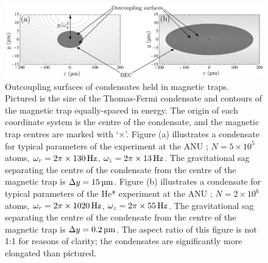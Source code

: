 \begin{figure}
    \centering
    \includegraphics[width=15cm]{OutcouplingSurfaces}
    \caption{Outcoupling surfaces of condensates held in magnetic traps.  Pictured is the size of the Thomas-Fermi condensate and contours of the magnetic trap equally-spaced in energy.  The origin of each coordinate system is the centre of the condensate, and the magnetic trap centres are marked with `$\times$'.  Figure (a) illustrates a condensate for typical parameters of the  experiment at the ANU \citep{Jeppesen:2008}; $N = 5 \times 10^5$ atoms, $\omega_r = 2 \pi \times \unit[130]{Hz}$, $\omega_z = 2 \pi \times \unit[13]{Hz}$.  The gravitational sag separating the centre of the condensate from the centre of the magnetic trap is $\Delta y = \unit[15]{\micro m}$.  Figure (b) illustrates a condensate for typical parameters of the He* experiment at the ANU \citep{Dall:2007a,Dall:2007}; $N = 2 \times 10^6$ atoms, $\omega_r = 2\pi \times \unit[1020]{Hz}$, $\omega_z = 2 \pi \times \unit[55]{Hz}$.  The gravitational sag separating the centre of the condensate from the centre of the magnetic trap is $\Delta y = \unit[0.2]{\micro m}$.  The aspect ratio of this figure is not 1:1 for reasons of clarity; the condensates are significantly more elongated than pictured.}
    \label{BackgroundTheory:OutcouplingSurfaces}
\end{figure}


